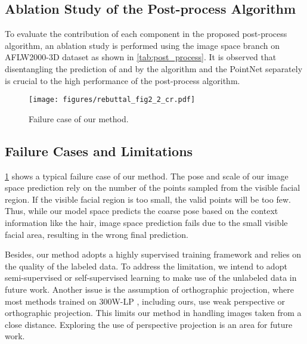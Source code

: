 \documentclass[10pt,twocolumn,letterpaper]{article}
\begin{document}
\subsection{Ablation Study of the Post-process Algorithm}
\label{sec:abla_post}
To evaluate the contribution of each component in the proposed post-process algorithm, an ablation study is performed using the image space branch on AFLW2000-3D dataset as shown in \cref{tab:post_process}. It is observed that disentangling the prediction of  and  by the  algorithm and the PointNet separately is crucial to the high performance of the post-process algorithm.


\begin{figure}[t]
  \centering
   \texttt{[image: figures/rebuttal\_fig2\_2\_cr.pdf]}
   \vspace{-5mm}
   \caption{Failure case of our method.}
   \label{fig:rebuttal_fig2}
\end{figure}

\subsection{Failure Cases and Limitations}
\cref{fig:rebuttal_fig2} shows a typical failure case of our method. The pose and scale of our image space prediction rely on the number of the points sampled from the visible facial region. If the visible facial region is too small, the valid points will be too few. Thus, while our model space predicts the coarse pose based on the context information like the hair, image space prediction fails due to the small visible facial area, resulting in the wrong final prediction. 

Besides, our method adopts a highly supervised training framework and relies on the quality of the labeled data. To address the limitation, we intend to adopt semi-supervised or self-supervised learning to make use of the unlabeled data in future work.  
Another issue is the assumption of orthographic projection, where most methods trained on 300W-LP \cite{zhu2016face}, including ours, use weak perspective or orthographic projection. This limits our method in handling images taken from a close distance. Exploring the use of perspective projection \cite{kao2022single} is an area for future work.
\end{document}
